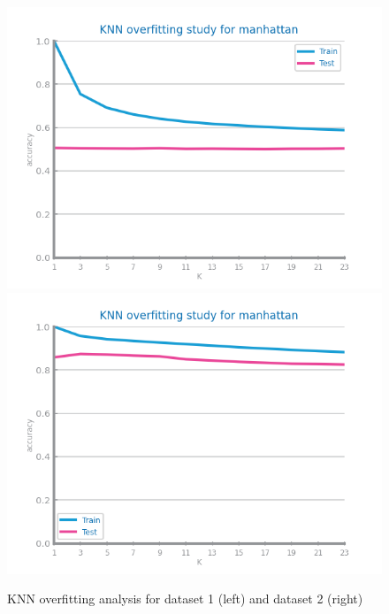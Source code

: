 \documentclass[10pt]{extarticle}
\begin{document}
\begin{figure}[H]
\centering\includegraphics[scale=0.7]{images/dataset1/models_evaluation/CovidPos_knn_overfitting.png}
\includegraphics[scale=0.7]{images/dataset2/models_evaluation/Credit_Score_knn_overfitting.png}
\caption{KNN overfitting analysis for dataset 1 (left) and dataset 2 (right)}
\end{figure}
\end{document}
